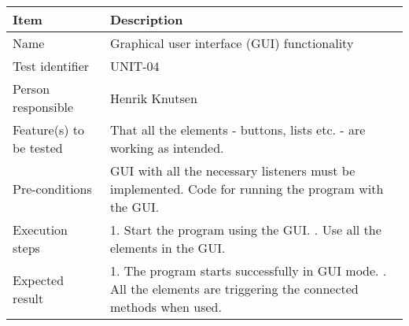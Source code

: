 \documentclass[12pt, fullpage, oneside]{report}
\begin{document}
		\begin{center}
			\begin{tabular}{ |  p{3.5cm} | p{10cm} | }
				\hline
				Item & Description \\ [5pt] \hline \hline
				Name & Graphical user interface (GUI) functionality \\  [5pt] \hline
				Test identifier & UNIT-04 \\  [5pt] \hline
				Person responsible & Henrik Knutsen \\  [5pt] \hline
				Feature(s) to be tested & That all the elements - buttons, lists etc. - are working as intended. \\  [5pt] \hline
				Pre-conditions & GUI with all the necessary listeners must be implemented. Code for running the program with the GUI. \\  [5pt] \hline
				Execution steps & 1. Start the program using the GUI. \newline 2. Use all the elements in the GUI. \\  [5pt] \hline
				Expected result & 1. The program starts successfully in GUI mode. \newline 2. All the elements are triggering the connected methods when used. \\  [5pt] \hline
			\end{tabular}
		\end{center}
\end{document}
